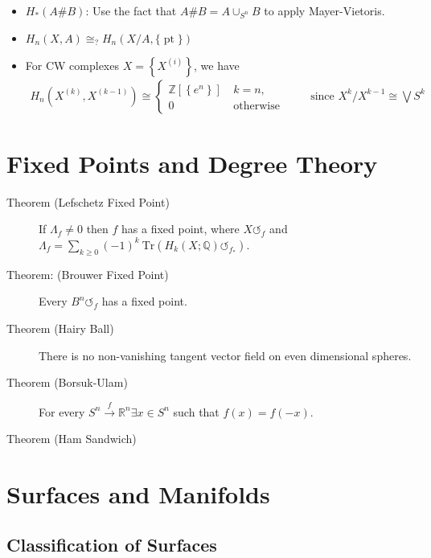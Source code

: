 \begin{itemize}
\tightlist
\item
  \(H_*(A \# B)\): Use the fact that \(A\# B = A \cup_{S^n} B\) to apply
  Mayer-Vietoris.
\item
  \(H_n(X, A) \cong_? H_n(X/A, {\{\operatorname{pt}\}})\)
\item
  For CW complexes \(X = \left\{{X^{(i)}}\right\}\), we have
  \begin{align*}
  H_n(X^{(k)},X^{(k-1)}) \cong \begin{cases}{\mathbb{Z}}[\left\{{e^n}\right\}]~ &k=n,\\ 0 &\text{otherwise}\end{cases} \qquad\text{ since } X^k/X^{k-1} \cong \bigvee S^k
  \end{align*}
\end{itemize}

\hypertarget{fixed-points-and-degree-theory}{%
\section{Fixed Points and Degree
Theory}\label{fixed-points-and-degree-theory}}

\begin{description}
\item[Theorem (Lefschetz Fixed Point)]
If \(\Lambda_f \neq 0\) then \(f\) has a fixed point, where
\(X{\circlearrowleft}_f\) and
\(\Lambda_f = \sum_{k \geq 0} (-1)^k ~\mathrm{Tr}(H_k(X; {\mathbb{Q}}) {\circlearrowleft}_{f_*})\).
\item[Theorem: (Brouwer Fixed Point)]
Every \(B^n {\circlearrowleft}_f\) has a fixed point.
\item[Theorem (Hairy Ball)]
There is no non-vanishing tangent vector field on even dimensional
spheres.
\item[Theorem (Borsuk-Ulam)]
For every \(S^n \xrightarrow{f} {\mathbb{R}}^n \exists x\in S^n\) such
that \(f(x) = f(-x)\).
\item[Theorem (Ham Sandwich)]
\end{description}


\hypertarget{surfaces-and-manifolds}{%
\section{Surfaces and Manifolds}\label{surfaces-and-manifolds}}

\hypertarget{classification-of-surfaces}{%
\subsection{Classification of
Surfaces}\label{classification-of-surfaces}}

